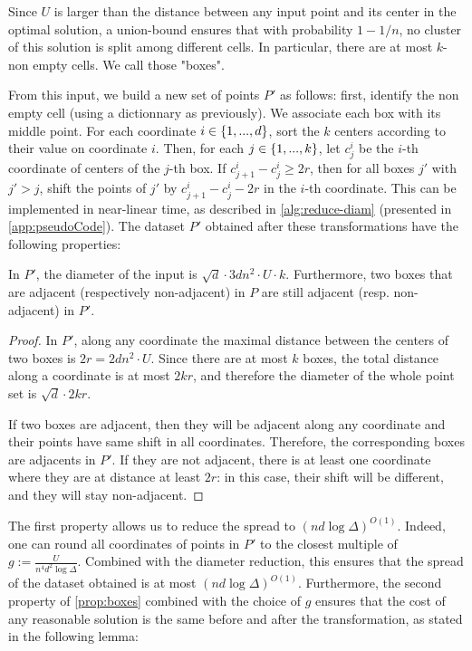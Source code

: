 Since $U$ is larger than the distance between any input point and its center in the optimal solution, a union-bound ensures that with probability $1-1/n$, no
cluster of this solution is split among different cells.  In particular, there are at most $k$-non empty cells. We call those "boxes".

From this input, we build a new set of points $P'$ as follows: first, identify the non empty cell (using a dictionnary as previously). We associate each box
with its middle point.  For each coordinate $i \in \left\{ 1, ..., d \right\}$, sort the $k$ centers according to their value on coordinate $i$. Then, for each $j
\in \left\{ 1, ..., k\right\}$, let $c^i_j$  be the $i$-th coordinate of centers of the $j$-th box. If $c^i_{j+1} - c^i_j \geq 2r$, then for all boxes $j'$ with $j'
> j$, shift the points of $j'$ by $c^i_{j+1} - c^i_j - 2r$ in the $i$-th coordinate. This can be implemented in near-linear time, as described in
\cref{alg:reduce-diam} (presented in \cref{app:pseudoCode}). The dataset $P'$ obtained after these transformations have the following properties:

\begin{proposition}\label{prop:boxes}
In $P'$, the diameter of the input is $\sqrt{d} \cdot 3d n^2\cdot U \cdot k$. 
Furthermore, two boxes that are adjacent (respectively non-adjacent) in $P$  are still adjacent (resp. non-adjacent) in $P'$.
\end{proposition}
\begin{proof}
In $P'$, along any coordinate the maximal distance between the centers of two boxes is $2r = 2d n^2\cdot U$. Since there are at most $k$ boxes, the total
distance along a coordinate is at most $2kr$, and therefore the diameter of the whole point set is $\sqrt{d} \cdot 2kr$.

If two boxes are adjacent, then they will be adjacent along any coordinate and their points have same shift in all coordinates. Therefore, the corresponding
boxes are adjacents in $P'$. If they are not adjacent, there is at least one coordinate where they are at distance at least $2r$: in this case, their shift will
be different, and they will stay non-adjacent.
\end{proof}

The first property allows us to reduce the spread to $(nd \log \Delta)^{O(1)}$.  Indeed, one can round all coordinates of points in $P'$ to the closest multiple
of $g := \frac{U}{n^4 d^{2} \log \Delta}$.  Combined with the diameter reduction, this ensures that the spread of the dataset obtained is at most $(nd \log
\Delta)^{O(1)}$.  Furthermore, the second property of \cref{prop:boxes} combined with the choice of $g$ ensures that the cost of any reasonable solution is the
same before and after the transformation, as stated in the following lemma:

